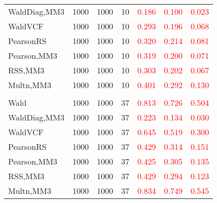 \documentclass[
]{article}
\begin{document}
\begin{table}[H]
{\begin{tabular}[t]{lrrrrrr}
\hspace{1em}WaldDiag,MM3 & 1000 & 1000 & 10 & \textcolor{red}{0.186} & \textcolor{red}{0.100} & \textcolor{red}{0.023}\\
\hspace{1em}WaldVCF & 1000 & 1000 & 10 & \textcolor{red}{0.293} & \textcolor{red}{0.196} & \textcolor{red}{0.068}\\
\hspace{1em}PearsonRS & 1000 & 1000 & 10 & \textcolor{red}{0.320} & \textcolor{red}{0.214} & \textcolor{red}{0.081}\\
\hspace{1em}Pearson,MM3 & 1000 & 1000 & 10 & \textcolor{red}{0.319} & \textcolor{red}{0.200} & \textcolor{red}{0.071}\\
\hspace{1em}RSS,MM3 & 1000 & 1000 & 10 & \textcolor{red}{0.303} & \textcolor{red}{0.202} & \textcolor{red}{0.067}\\
\hspace{1em}Multn,MM3 & 1000 & 1000 & 10 & \textcolor{red}{0.401} & \textcolor{red}{0.292} & \textcolor{red}{0.130}\\
\addlinespace[0.3em]
\multicolumn{7}{l}{\textbf{3F 15V}}\\
\hspace{1em}Wald & 1000 & 1000 & 37 & \textcolor{red}{0.813} & \textcolor{red}{0.726} & \textcolor{red}{0.504}\\
\hspace{1em}WaldDiag,MM3 & 1000 & 1000 & 37 & \textcolor{red}{0.223} & \textcolor{red}{0.134} & \textcolor{red}{0.030}\\
\hspace{1em}WaldVCF & 1000 & 1000 & 37 & \textcolor{red}{0.645} & \textcolor{red}{0.519} & \textcolor{red}{0.300}\\
\hspace{1em}PearsonRS & 1000 & 1000 & 37 & \textcolor{red}{0.429} & \textcolor{red}{0.314} & \textcolor{red}{0.151}\\
\hspace{1em}Pearson,MM3 & 1000 & 1000 & 37 & \textcolor{red}{0.425} & \textcolor{red}{0.305} & \textcolor{red}{0.135}\\
\hspace{1em}RSS,MM3 & 1000 & 1000 & 37 & \textcolor{red}{0.429} & \textcolor{red}{0.294} & \textcolor{red}{0.123}\\
\hspace{1em}Multn,MM3 & 1000 & 1000 & 37 & \textcolor{red}{0.834} & \textcolor{red}{0.749} & \textcolor{red}{0.545}\\
\bottomrule
\end{tabular}}
\endgroup{}
\end{table}
\end{document}
